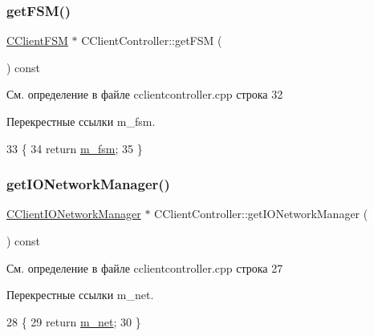 \subsubsection{\texorpdfstring{get\+F\+S\+M()}{getFSM()}}
{\footnotesize\ttfamily \hyperlink{class_c_client_f_s_m}{C\+Client\+F\+SM} $\ast$ C\+Client\+Controller\+::get\+F\+SM (\begin{DoxyParamCaption}{ }\end{DoxyParamCaption}) const}



См. определение в файле cclientcontroller.\+cpp строка 32



Перекрестные ссылки m\+\_\+fsm.


\begin{DoxyCode}
33 \{
34     \textcolor{keywordflow}{return} \hyperlink{class_c_client_controller_ade8b08c2eae487031b6b64dac3296f5d}{m\_fsm};
35 \}
\end{DoxyCode}
\hypertarget{class_c_client_controller_ab39fa71b009189acc06aa759d636de4d}{}\label{class_c_client_controller_ab39fa71b009189acc06aa759d636de4d} 
\subsubsection{\texorpdfstring{get\+I\+O\+Network\+Manager()}{getIONetworkManager()}}
{\footnotesize\ttfamily \hyperlink{class_c_client_i_o_network_manager}{C\+Client\+I\+O\+Network\+Manager} $\ast$ C\+Client\+Controller\+::get\+I\+O\+Network\+Manager (\begin{DoxyParamCaption}{ }\end{DoxyParamCaption}) const}



См. определение в файле cclientcontroller.\+cpp строка 27



Перекрестные ссылки m\+\_\+net.


\begin{DoxyCode}
28 \{
29     \textcolor{keywordflow}{return} \hyperlink{class_c_client_controller_ae97793346f702b77829129673408df48}{m\_net};
30 \}
\end{DoxyCode}
\hypertarget{class_c_client_controller_a1dabfbc538daf66f1c2565808bc7db6d}{}\label{class_c_client_controller_a1dabfbc538daf66f1c2565808bc7db6d} 
